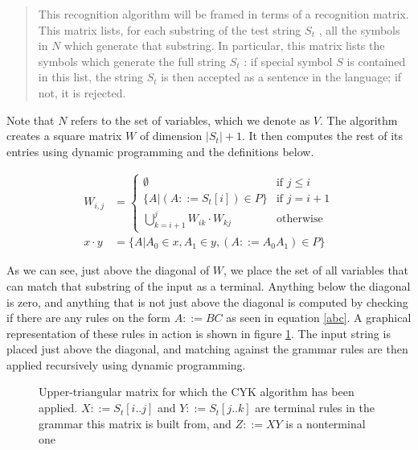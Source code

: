 \documentclass[a4paper,12pt,notitlepage]{report}
\newcommand{\subt}[3] { 
  \draw[grid] (#1,#1) -- (#1,#2) node[inChart] {#3} -- (#2,#2);
  \fill[color=black] (#1,#2) circle (2pt)
 }
\newcommand{\mrk}[2]{\node[inChart] at (#1,#1) {#2}}
\begin{document}
\begin{quote}
This recognition algorithm will be framed in terms of a recognition
matrix. This matrix lists, for each substring of the test string $S_t$ , all
the symbols in $N$ which generate that substring. In particular, this
matrix lists the symbols which generate the full string $S_t$ : if special
symbol $S$ is contained in this list, the string $S_t$ is then accepted as a
sentence in the language; if not, it is rejected.
\end{quote}

Note that $N$ refers to the set of variables, which we denote as $V$. The
algorithm creates a square matrix $W$ of dimension $|S_t|+1$.  It then computes
the rest of its entries using dynamic programming and the definitions below.

\begin{align}
W_{i,j}   &= \begin{cases}
            \emptyset & \mbox{if }j \leq i \\
            \{ A | (A ::= S_t[i]) \in P \} & \mbox{if }j=i+1 \\
            \displaystyle\bigcup_{k=i+1}^{j} W_{ik} \cdot W_{kj} & \mbox{otherwise}
            \end{cases} \\
x \cdot y &= \{ A | A_0 \in x, A_1 \in y, (A ::= A_0A_1) \in P \} \label{abc}
\end{align}

As we can see, just above the diagonal of $W$, we place the set of all variables
that can match that substring of the input as a terminal. Anything below the
diagonal is zero, and anything that is not just above the diagonal is computed
by checking if there are any rules on the form $A ::= BC$ as seen in equation
\ref{abc}. A graphical representation of these rules in action is shown in
figure \ref{exchart}. The input string is placed just above the diagonal, and
matching against the grammar rules are then applied recursively using dynamic
programming. 

\begin{figure}[H]
  \centering
  \caption{\label{exchart} \small Upper-triangular matrix for which the CYK algorithm
           has been applied. $X ::= S_t[i..j]$ and $Y ::= S_t[j..k]$ are
           terminal rules in the grammar this matrix is built from, and $Z
           ::= XY$ is a nonterminal one} 
\end{figure}
\end{document}
